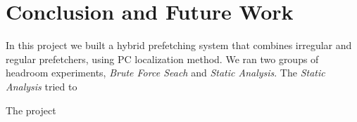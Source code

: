 \section{Conclusion and Future Work}
\label{sec:conclusion}

In this project we built a hybrid prefetching system that combines irregular and regular prefetchers, using PC localization method. We ran two groups of headroom experiments, \emph{Brute Force Seach} and \emph{Static Analysis}. The \emph{Static Analysis} tried to 


The project

